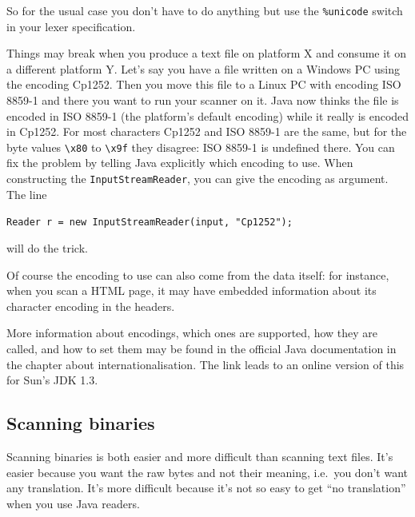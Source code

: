 \documentclass[11pt]{scrartcl}
\begin{document}
So for the usual case you don't have to do anything but use the
\texttt{\%unicode} switch in your lexer specification.

Things may break when you produce a text file on platform X and
consume it on a different platform Y. Let's say you have a file
written on a Windows PC using the encoding Cp1252. Then you move
this file to a Linux PC with encoding ISO 8859-1 and there you want
to run your scanner on it. Java now thinks the file is encoded
in ISO 8859-1 (the platform's default encoding) while it really is 
encoded in Cp1252. For most characters
Cp1252 and ISO 8859-1 are the same, but for the byte values \verb+\x80+
to \verb+\x9f+ they disagree: ISO 8859-1 is undefined there. You can fix
the problem by telling Java explicitly which encoding to use. When
constructing the \texttt{InputStreamReader}, you can give the encoding
as argument. The line
\begin{center}
\texttt{Reader r = new InputStreamReader(input, "Cp1252"); }
\end{center}
will do the trick.

Of course the encoding to use can also come from the data itself:
for instance, when you scan a HTML page, it may have embedded 
information about its character encoding in the headers.

More information about encodings, which ones are supported, how
they are called, and how to set them may be found in the
official Java documentation in the chapter about 
internationalisation. 
The link 
leads to an online version of this for Sun's JDK 1.3.

\subsection{Scanning binaries\label{sec:howtobinary}}

Scanning binaries is both easier and more difficult
than scanning text files. It's easier because you want
the raw bytes and not their meaning, i.e.~you don't want 
any translation.
It's more difficult because it's not so easy to get
``no translation'' when you use Java readers. 
\end{document}
